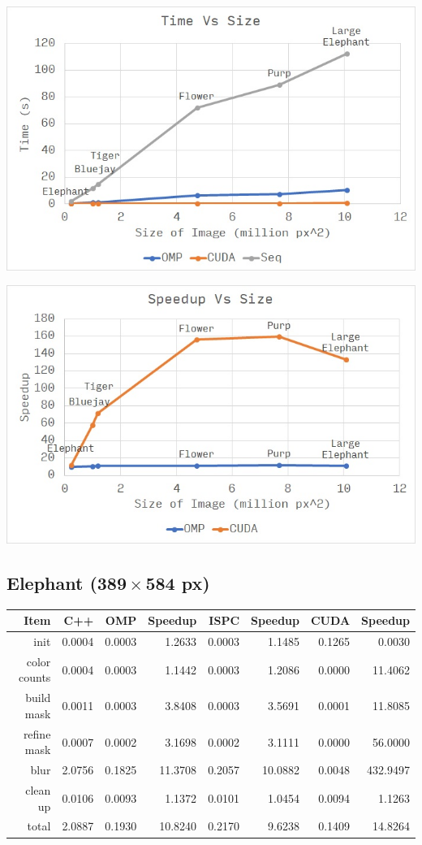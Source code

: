 \documentclass[12pt]{article}
\begin{document}
\begin{center}
\includegraphics[scale=1]{time.jpg}
\end{center}

\begin{center}
\includegraphics[scale=1]{speedup.jpg}
\end{center}

\subsection{Elephant ($\mathbf{389 \times 584}$ px)}

\begin{tabular}{r|r|r|r|r|r|r|r}
    Item & C++ & OMP & Speedup & ISPC & Speedup & CUDA & Speedup
\\  \hline
    init & 0.0004 & 0.0003 & 1.2633 & 0.0003 & 1.1485 & 0.1265 & 0.0030
\\  color counts & 0.0004 & 0.0003 & 1.1442 & 0.0003 & 1.2086 & 0.0000 & 11.4062
\\  build mask & 0.0011 & 0.0003 & 3.8408 & 0.0003 & 3.5691 & 0.0001 & 11.8085
\\  refine mask & 0.0007 & 0.0002 & 3.1698 & 0.0002 & 3.1111 & 0.0000 & 56.0000
\\  blur & 2.0756 & 0.1825 & 11.3708 & 0.2057 & 10.0882 & 0.0048 & 432.9497
\\  clean up & 0.0106 & 0.0093 & 1.1372 & 0.0101 & 1.0454 & 0.0094 & 1.1263
\\  \hline
    total & 2.0887 & 0.1930 & 10.8240 & 0.2170 & 9.6238 & 0.1409 & 14.8264
\end{tabular}
\end{document}
